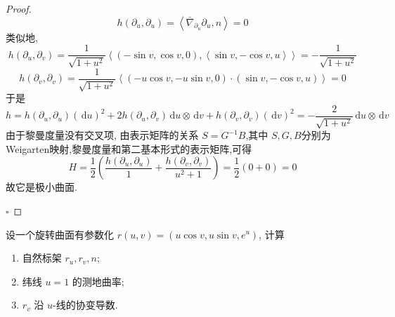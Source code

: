 \documentclass[../../main.tex]{subfiles}
\begin{document}
\begin{proof}
\[    \] \[
    h\left( \partial_u,\partial_u \right)= \left< \bar{\nabla}_{\partial_u}\partial_u ,n\right>= 0
    \]
    类似地, \[
    h\left(  \partial _{u}, \partial _{v} \right)= \frac{1 }{\sqrt{1+ u^{2}} } \left<\left( -\sin v,\cos v,0 \right), \left<\sin v,-\cos v,u \right>  \right>= -\frac{1 }{\sqrt{1+ u^{2}} }  
    \] \[
    h\left(  \partial _{v}, \partial _{v} \right)= \frac{1 }{\sqrt{1+ u^{2}} }\left<\left( -u\cos v,-u\sin v,0 \right)\cdot \left( \sin v,-\cos v,u \right)   \right>= 0  
    \]于是 \[
    h= h\left(  \partial _{u}, \partial _{u} \right)\left( \,\mathrm{d} u \right)^{2}+2 h\left(  \partial _{u}, \partial _{v} \right)\,\mathrm{d} u\otimes \,\mathrm{d} v   + h\left(  \partial _{v}, \partial _{v} \right) \left( \,\mathrm{d} v \right)^{2}= -\frac{2 }{\sqrt{1+ u^{2}} }\,\mathrm{d} u\otimes \,\mathrm{d} v   
    \] 由于黎曼度量没有交叉项, 由表示矩阵的关系 \(  S= G^{-1} B  \),其中 \(  S,G,B  \)分别为Weigarten映射,黎曼度量和第二基本形式的表示矩阵,可得  \[
    H= \frac{1 }{2 }\left( \frac{h\left(  \partial _{u}, \partial _{u} \right)  }{1 }+ \frac{h\left(  \partial _{v}, \partial _{v} \right)  }{u^{2}+ 1 }   \right)= \frac{1}{2}\left( 0+ 0 \right)= 0   
    \]故它是极小曲面.

    \hfill $\square$
\end{proof}
\begin{problem}
设一个旋转曲面有参数化 $r(u, v) = (u \cos v, u \sin v, e^u)$, 计算
\begin{enumerate}
\item 自然标架 $r_u, r_v, n$;
\item 纬线 $u=1$ 的测地曲率;
\item $r_v$ 沿 $u$-线的协变导数.
\end{enumerate}
\end{problem}
\end{document}
